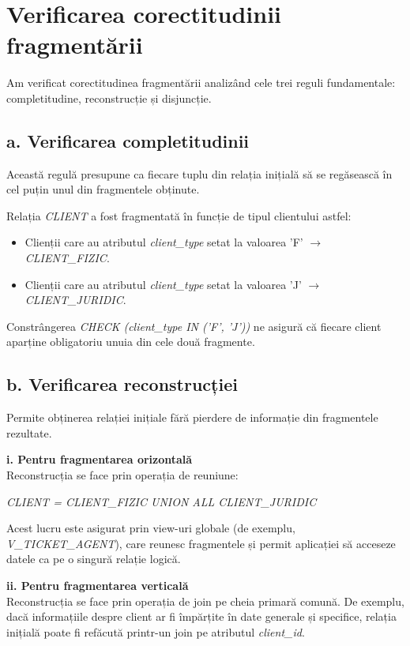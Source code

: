 \chapter{Verificarea corectitudinii fragmentării}
\label{sec:corectitudine}

Am verificat corectitudinea fragmentării analizând cele trei reguli fundamentale: completitudine, reconstrucție și disjuncție.

\section*{a. Verificarea completitudinii}

Această regulă presupune ca fiecare tuplu din relația inițială să se regăsească în cel puțin unul din fragmentele obținute.

Relația \textit{CLIENT} a fost fragmentată în funcție de tipul clientului astfel:
\begin{itemize}
    \item Clienții care au atributul \textit{client\_type} setat la valoarea 'F' $\rightarrow$ \textit{CLIENT\_FIZIC}.
    \item Clienții care au atributul \textit{client\_type} setat la valoarea 'J' $\rightarrow$ \textit{CLIENT\_JURIDIC}.
\end{itemize}

Constrângerea \textit{CHECK (client\_type IN ('F', 'J'))} ne asigură că fiecare client aparține obligatoriu unuia din cele două fragmente.

\section*{b. Verificarea reconstrucției}

Permite obținerea relației inițiale fără pierdere de informație din fragmentele rezultate.

\textbf{i. Pentru fragmentarea orizontală}\\
Reconstrucția se face prin operația de reuniune: 
\begin{center}
    \textit{CLIENT = CLIENT\_FIZIC UNION ALL CLIENT\_JURIDIC}
\end{center}
Acest lucru este asigurat prin view-uri globale (de exemplu, \textit{V\_TICKET\_AGENT}), care reunesc fragmentele și permit aplicației să acceseze datele ca pe o singură relație logică.

\textbf{ii. Pentru fragmentarea verticală}\\
Reconstrucția se face prin operația de join pe cheia primară comună. De exemplu, dacă informațiile despre client ar fi împărțite în date generale și specifice, relația inițială poate fi refăcută printr-un join pe atributul \textit{client\_id}.


